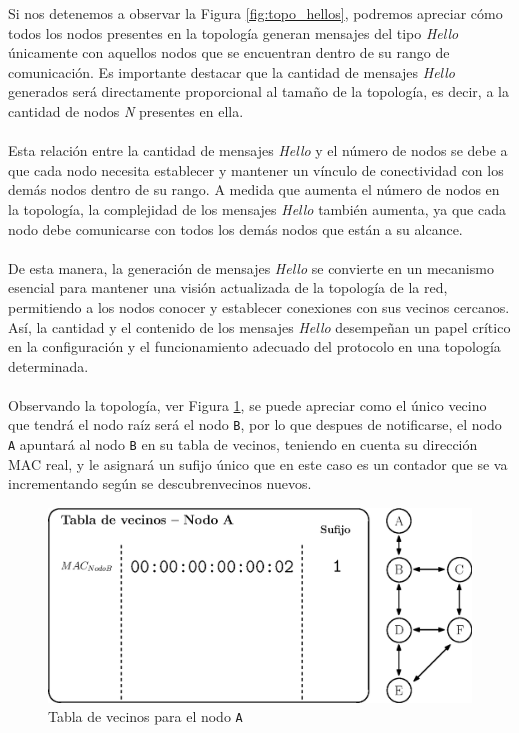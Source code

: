 Si nos detenemos a observar la Figura \ref{fig:topo_hellos}, podremos apreciar cómo todos los nodos presentes en la topología generan mensajes del tipo \textit{Hello} únicamente con aquellos nodos que se encuentran dentro de su rango de comunicación. Es importante destacar que la cantidad de mensajes \textit{Hello} generados será directamente proporcional al tamaño de la topología, es decir, a la cantidad de nodos \textit{N} presentes en ella.\\
\\
Esta relación entre la cantidad de mensajes \textit{Hello} y el número de nodos se debe a que cada nodo necesita establecer y mantener un vínculo de conectividad con los demás nodos dentro de su rango. A medida que aumenta el número de nodos en la topología, la complejidad de los mensajes \textit{Hello} también aumenta, ya que cada nodo debe comunicarse con todos los demás nodos que están a su alcance.\\
\\
De esta manera, la generación de mensajes \textit{Hello} se convierte en un mecanismo esencial para mantener una visión actualizada de la topología de la red, permitiendo a los nodos conocer y establecer conexiones con sus vecinos cercanos. Así, la cantidad y el contenido de los mensajes \textit{Hello} desempeñan un papel crítico en la configuración y el funcionamiento adecuado del protocolo en una topología determinada.\\
\\
Observando la topología, ver Figura \ref{fig:topo_hello_nodoA_nb}, se puede apreciar como el único vecino que tendrá el nodo raíz será el nodo \texttt{B}, por lo que despues de notificarse, el nodo \texttt{A} apuntará al nodo \texttt{B} en su tabla de vecinos, teniendo en cuenta su dirección MAC real, y le asignará un sufijo único que en este caso es un contador que se va incrementando según se descubrenvecinos nuevos.\\

\begin{figure}[ht!]
    \centering
    \includegraphics[width=\textwidth]{archivos/img/dev/topo_hello_nodoA_nb.eps}
    \caption{Tabla de vecinos para el nodo \texttt{A}}
    \label{fig:topo_hello_nodoA_nb}
\end{figure}

